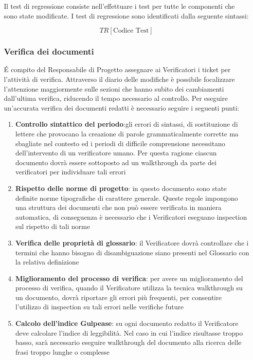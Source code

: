 Il test di regressione consiste nell'effettuare i test per tutte le
componenti che sono state modificate. I test di regressione sono
identificati dalla seguente sintassi: 

$$ TR[\text{Codice Test}] $$ 

\subsubsection{Verifica dei documenti}

\'E compito del Responsabile di Progetto assegnare ai Verificatori i ticket per l'attività di verifica. Attraverso il diario delle modifiche è possibile focalizzare l'attenzione maggiormente sulle sezioni che hanno subito dei cambiamenti dall'ultima verifica, riducendo il tempo necessario al controllo.
Per eseguire un'accurata verifica dei documenti redatti è necessario seguire i seguenti
punti:
\begin{enumerate}
	\item \textbf{Controllo sintattico del periodo}:gli errori di sintassi, di sostituzione di lettere che provocano la creazione di parole grammaticalmente corrette ma sbagliate nel
	contesto ed i periodi di difficile comprensione necessitano dell'intervento di un verificatore umano. Per questa ragione ciascun documento dovrà essere sottoposto
	ad un walkthrough da parte dei verificatori per individuare tali errori
	\item \textbf{Rispetto delle norme di progetto}: in questo documento sono state definite
	norme tipografiche di carattere generale. Queste regole impongono una struttura
	dei documenti che non può essere verificata in maniera automatica, di conseguenza è necessario che i Verificatori eseguano inspection sul rispetto di tali norme
	\item \textbf{Verifica delle proprietà di glossario}: il Verificatore dovrà controllare che
	i termini che hanno bisogno di disambiguazione siano presenti nel Glossario con la relativa definizione
	\item \textbf{Miglioramento del processo di verifica}: per avere un miglioramento del
	processo di verifica, quando il Verificatore utilizza la tecnica walkthrough su un
	documento, dovrà riportare gli errori più frequenti, per consentire l'utilizzo di
	inspection su tali errori nelle verifiche future
	\item \textbf{Calcolo dell’indice Gulpease}: su ogni documento redatto il Verificatore deve calcolare l’indice di leggibilità. Nel caso in cui l'indice risultasse troppo basso, sarà necessario eseguire walkthrough del documento alla ricerca delle frasi troppo lunghe o complesse
\end{enumerate}

